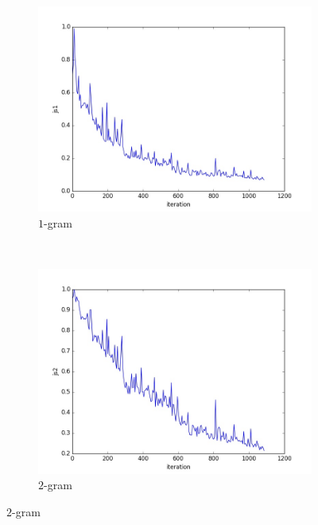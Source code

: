 \documentclass[10pt,a4paper]{article}
\begin{document}
\begin{figure}[H]
    \centering
    \begin{subfigure}[b]{0.4\textwidth}
        \includegraphics[width=\textwidth]{cuted_small/js1}
        \caption{$1$-gram}
    \end{subfigure}
    ~ 
    \begin{subfigure}[b]{0.4\textwidth}
        \includegraphics[width=\textwidth]{cuted_small/js2}
        \caption{$2$-gram}
    \end{subfigure}
    

\end{figure}
\end{document}
